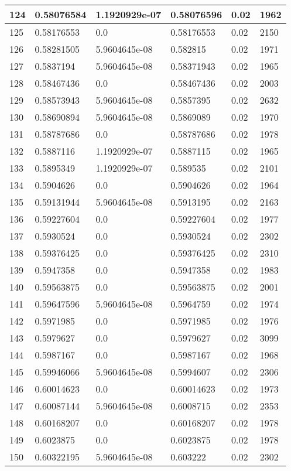 \begin{longtable}{|l|l|l|l|l|l|}
124 & 0.58076584 & 1.1920929e-07 & 0.58076596 & 0.02 & 1962 \\ \hline 
125 & 0.58176553 & 0.0 & 0.58176553 & 0.02 & 2150 \\ \hline 
126 & 0.58281505 & 5.9604645e-08 & 0.582815 & 0.02 & 1971 \\ \hline 
127 & 0.5837194 & 5.9604645e-08 & 0.58371943 & 0.02 & 1965 \\ \hline 
128 & 0.58467436 & 0.0 & 0.58467436 & 0.02 & 2003 \\ \hline 
129 & 0.58573943 & 5.9604645e-08 & 0.5857395 & 0.02 & 2632 \\ \hline 
130 & 0.58690894 & 5.9604645e-08 & 0.5869089 & 0.02 & 1970 \\ \hline 
131 & 0.58787686 & 0.0 & 0.58787686 & 0.02 & 1978 \\ \hline 
132 & 0.5887116 & 1.1920929e-07 & 0.5887115 & 0.02 & 1965 \\ \hline 
133 & 0.5895349 & 1.1920929e-07 & 0.589535 & 0.02 & 2101 \\ \hline 
134 & 0.5904626 & 0.0 & 0.5904626 & 0.02 & 1964 \\ \hline 
135 & 0.59131944 & 5.9604645e-08 & 0.5913195 & 0.02 & 2163 \\ \hline 
136 & 0.59227604 & 0.0 & 0.59227604 & 0.02 & 1977 \\ \hline 
137 & 0.5930524 & 0.0 & 0.5930524 & 0.02 & 2302 \\ \hline 
138 & 0.59376425 & 0.0 & 0.59376425 & 0.02 & 2310 \\ \hline 
139 & 0.5947358 & 0.0 & 0.5947358 & 0.02 & 1983 \\ \hline 
140 & 0.59563875 & 0.0 & 0.59563875 & 0.02 & 2001 \\ \hline 
141 & 0.59647596 & 5.9604645e-08 & 0.5964759 & 0.02 & 1974 \\ \hline 
142 & 0.5971985 & 0.0 & 0.5971985 & 0.02 & 1976 \\ \hline 
143 & 0.5979627 & 0.0 & 0.5979627 & 0.02 & 3099 \\ \hline 
144 & 0.5987167 & 0.0 & 0.5987167 & 0.02 & 1968 \\ \hline 
145 & 0.59946066 & 5.9604645e-08 & 0.5994607 & 0.02 & 2306 \\ \hline 
146 & 0.60014623 & 0.0 & 0.60014623 & 0.02 & 1973 \\ \hline 
147 & 0.60087144 & 5.9604645e-08 & 0.6008715 & 0.02 & 2353 \\ \hline 
148 & 0.60168207 & 0.0 & 0.60168207 & 0.02 & 1978 \\ \hline 
149 & 0.6023875 & 0.0 & 0.6023875 & 0.02 & 1978 \\ \hline 
150 & 0.60322195 & 5.9604645e-08 & 0.603222 & 0.02 & 2302 \\ \hline 
\end{longtable}
